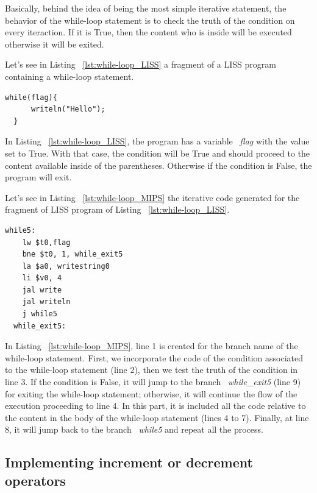\documentclass[
  oneside,
  11pt, a4paper,
  footinclude=true,
  headinclude=true,
  cleardoublepage=empty
]{scrbook}
\begin{document}
Basically, behind the idea of being the most simple iterative statement, the behavior of the while-loop statement is to check the truth of the condition on every iteraction. If it is True, then the content who is inside will be executed otherwise it will be exited.

Let's see in Listing ~\ref{lst:while-loop_LISS} a fragment of a LISS program containing a while-loop statement.

\begin{lstlisting}[caption={Example of a while-loop statement in LISS},label={lst:while-loop_LISS}]
  while(flag){
      writeln("Hello");
  }
\end{lstlisting}

In Listing ~\ref{lst:while-loop_LISS}, the program has a variable ~\textit{flag} with the value set to True. With that case, the condition will be True and should proceed to the content available inside of the parentheses. Otherwise if the condition is False, the program will exit.

Let's see in Listing ~\ref{lst:while-loop_MIPS} the iterative code generated for the fragment of LISS program of Listing ~\ref{lst:while-loop_LISS}.

\begin{lstlisting}[caption={Iterative code generated for the LISS program in Listing ~\ref{lst:while-loop_LISS}},label={lst:while-loop_MIPS}]
  while5:		
    lw $t0,flag		
    bne $t0, 1, while_exit5	
    la $a0, writestring0
    li $v0, 4
    jal write		
    jal writeln		
    j while5		
  while_exit5:		
\end{lstlisting}

In Listing ~\ref{lst:while-loop_MIPS}, line 1 is created for the branch name of the while-loop statement. First, we incorporate the code of the condition associated to the while-loop statement (line 2), then we test the truth of the condition in line 3. If the condition is False, it will jump to the branch ~\textit{while\_exit5} (line 9) for exiting the while-loop statement; otherwise, it will continue the flow of the execution proceeding to line 4. In this part, it is included all the code relative to the content in the body of the while-loop statement (lines 4 to 7). Finally, at line 8, it will jump back to the branch ~\textit{while5} and repeat all the process.

\subsection{Implementing increment or decrement operators}
\end{document}
